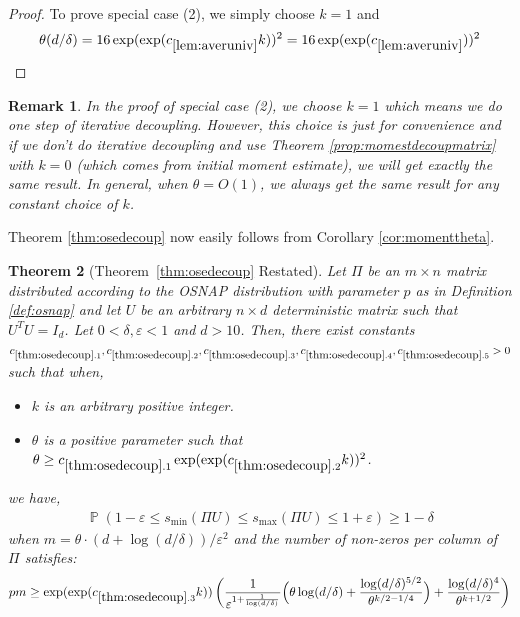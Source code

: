 \documentclass[11pt]{amsart}
\numberwithin{equation}{section}
\numberwithin{equation}{section}
\DeclareMathOperator{\Pb}{\mathbb{P}}
\newtheorem{theorem}{Theorem}[section]
\newtheorem{remark}[theorem]{Remark}
\begin{document}
\begin{proof}
To prove special case (2), we simply choose $k=1$ and \begin{align*}
    \theta(d/\delta)=16\exp(\exp(c_{\ref{lem:averuniv}}k))^2=16\exp(\exp(c_{\ref{lem:averuniv}}))^2
\end{align*}

\end{proof}

\begin{remark}
In the proof of special case (2), we choose $k=1$ which means we do one step of iterative decoupling. However, this choice is just for convenience and if we don't do iterative decoupling and use Theorem \ref{prop:momestdecoupmatrix} with $k=0$ (which comes from initial moment estimate), we will get exactly the same result. In general, when $\theta=O(1)$, we always get the same result for any constant choice of $k$.
\end{remark}

Theorem \ref{thm:osedecoup} now easily follows from Corollary \ref{cor:momenttheta}.


\begin{theorem}[Theorem~\ref{thm:osedecoup} Restated]
    Let $\Pi$ be an $m \times n$ matrix distributed according to the OSNAP distribution with parameter $p$ as in Definition \ref{def:osnap} and let $U$ be an arbitrary $n \times d$ deterministic matrix such that $U^TU=I_d$. Let $0 < \delta, \varepsilon < 1$ and $d>10$. Then, there exist constants $c_{\ref{thm:osedecoup}.1}, c_{\ref{thm:osedecoup}.2}, c_{\ref{thm:osedecoup}.3}, c_{\ref{thm:osedecoup}.4}, c_{\ref{thm:osedecoup}.5} >0$ such that when,
\begin{itemize}
    \item $k$ is an arbitrary positive integer.
    \item $\theta$ is a positive parameter such that $\theta \ge c_{\ref{thm:osedecoup}.1} \exp(\exp(c_{\ref{thm:osedecoup}.2}k))^2$. 
\end{itemize}
we have,
\begin{equation}
    \begin{aligned}
\Pb \left( 1 - \varepsilon  \leq s_{\min}(\Pi U)   \leq s_{\max}(\Pi U) \leq 1 + \varepsilon \right) \geq 1-\delta
\end{aligned}
\end{equation}
when $m=\theta\cdot(d+\log(d/\delta))/\varepsilon^2$ and the number of non-zeros per column of $\Pi$ satisfies:
\begin{align}
    \begin{aligned} 
    {pm } \ge {\exp(\exp(c_{\ref{thm:osedecoup}.3}k))}\left(\frac{1}{\varepsilon^{1+\frac{1}{\log(d/\delta)}}}\Big(\theta \log(d/\delta)+\frac{\log(d/\delta)^{5/2}}{\theta ^{k/2-1/4}}\Big)+\frac{ \log(d/\delta)^{4}}{\theta ^{k+1/2}}\right)
\end{aligned}
\end{align}



\end{theorem}
\end{document}
